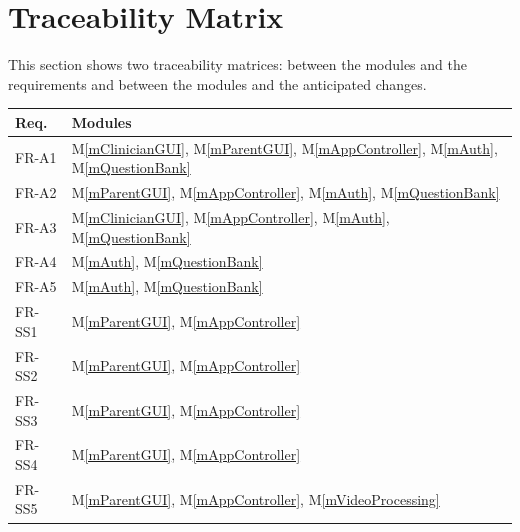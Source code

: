 \documentclass[12pt, titlepage]{article}
\newcommand{\mref}[1]{M\ref{#1}}
\begin{document}
\section{Traceability Matrix} \label{SecTM}

This section shows two traceability matrices: between the modules and the
requirements and between the modules and the anticipated changes.

\begin{table}[H]
  \centering
  \begin{tabular}{p{} p{}}
  \toprule
  \textbf{Req.} & \textbf{Modules}\\
  \midrule
  
  FR-A1 & \mref{mClinicianGUI}, \mref{mParentGUI}, \mref{mAppController}, \mref{mAuth}, \mref{mQuestionBank}\\
  FR-A2 & \mref{mParentGUI}, \mref{mAppController}, \mref{mAuth}, \mref{mQuestionBank}\\
  FR-A3 & \mref{mClinicianGUI}, \mref{mAppController}, \mref{mAuth}, \mref{mQuestionBank}\\
  FR-A4 & \mref{mAuth}, \mref{mQuestionBank}\\
  FR-A5 & \mref{mAuth}, \mref{mQuestionBank}\\
  
  FR-SS1 & \mref{mParentGUI}, \mref{mAppController}\\
  FR-SS2 & \mref{mParentGUI}, \mref{mAppController}\\
  FR-SS3 & \mref{mParentGUI}, \mref{mAppController}\\
  FR-SS4 & \mref{mParentGUI}, \mref{mAppController}\\
  FR-SS5 & \mref{mParentGUI}, \mref{mAppController}, \mref{mVideoProcessing}\\
  

\end{tabular}
\end{table}
\end{document}
